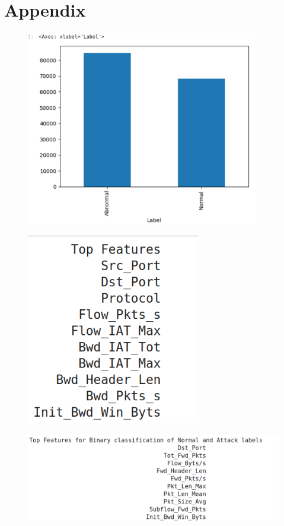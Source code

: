 \chapter*{Appendix}
\begin{figure}[tbh]
	\begin{center}
		\includegraphics[width=4in]{images/binvattlab.png}
	\end{center}
\end{figure}
\begin{figure}[tbh]
	\begin{center}
		\includegraphics[width=3in]{images/top10att.png}
	\end{center}
\end{figure}
\begin{figure}[tbh]
	\begin{center}
		\includegraphics[width=5in]{images/top10normatt.png}
	\end{center}
\end{figure}
